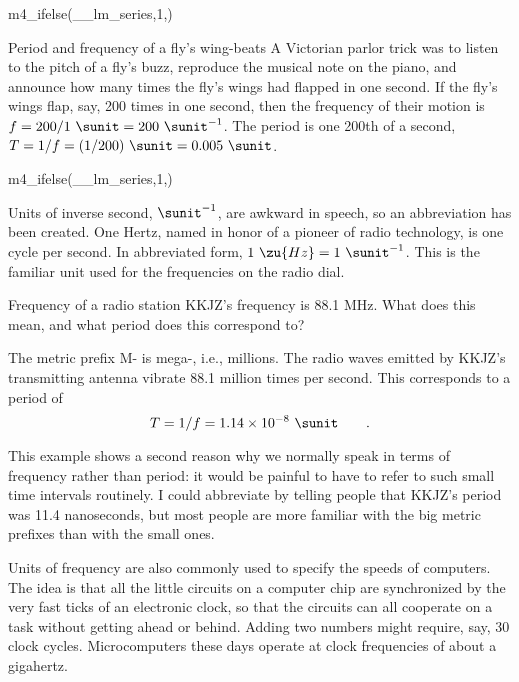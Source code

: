 m4_ifelse(__lm_series,1,\vspace{10mm})


\begin{eg}{Period and frequency of a fly's wing-beats}
A Victorian parlor trick was to listen to the pitch of a
fly's buzz, reproduce the musical note on the piano, and
announce how many times the fly's wings had flapped in one
second. If the fly's wings flap, say, 200 times in one
second, then the frequency of their motion is $f=200/1\ \sunit=200\ \sunit^{-1}$.
The period is one 200th of a second, $T=1/f=(1/200)\ \sunit=0.005\ \sunit$.
\end{eg}

m4_ifelse(__lm_series,1,\pagebreak[4])

Units of inverse second, $\sunit^{-1}$, are awkward in speech, so an
abbreviation has been created. One Hertz, named in honor of
a pioneer of radio technology, is one cycle per second. In
abbreviated form, $1\ \zu{Hz}=1\ \sunit^{-1}$. This is the familiar unit
used for the frequencies on the radio dial.

\begin{eg}{Frequency of a radio station}
\egquestion KKJZ's frequency is 88.1 MHz. What does this mean,
and what period does this correspond to?

\eganswer The metric prefix M- is mega-, i.e., millions. The
radio waves emitted by KKJZ's transmitting antenna vibrate
88.1 million times per second. This corresponds to a period of
\begin{equation*}
 T = 1/f= 1.14\times10^{-8}\ \sunit \qquad .
\end{equation*}

This example shows a second reason why we normally speak in
terms of frequency rather than period: it would be painful
to have to refer to such small time intervals routinely. I
could abbreviate by telling people that KKJZ's period was
11.4 nanoseconds, but most people are more familiar with the
big metric prefixes than with the small ones.
\end{eg}

Units of frequency are also commonly used to specify the
speeds of computers. The idea is that all the little
circuits on a computer chip are synchronized by the very
fast ticks of an electronic clock, so that the circuits can
all cooperate on a task without getting ahead or behind.
Adding two numbers might require, say, 30 clock cycles.
Microcomputers these days operate at clock frequencies
of about a gigahertz.

